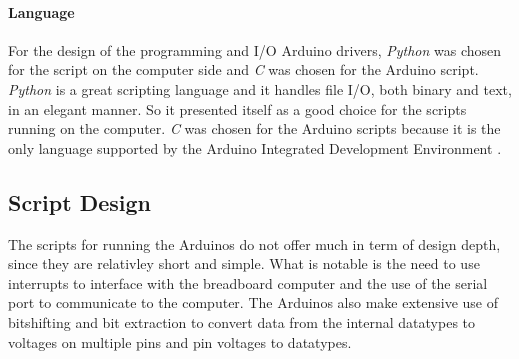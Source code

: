 \paragraph{Language} For the design of the programming and I/O Arduino drivers, \emph{Python} was chosen for the
script on the computer side and \emph{C} was chosen for the Arduino script. \emph{Python} is a great scripting
language and it handles file I/O, both binary and text, in an elegant manner. So it presented itself as a good
choice for the scripts running on the computer. \emph{C} was chosen for the Arduino scripts because it is the only
language supported by the Arduino Integrated Development Environment \cite{arduino_ide}.

\subsection{Script Design}
The scripts for running the Arduinos do not offer much in term of design depth, since they are relativley short
and simple. What is notable is the need to use interrupts to interface with the breadboard computer and the use of
the serial port to communicate to the computer. The Arduinos also make extensive use of bitshifting and bit
extraction to convert data from the internal datatypes to voltages on multiple pins and pin voltages to datatypes.
